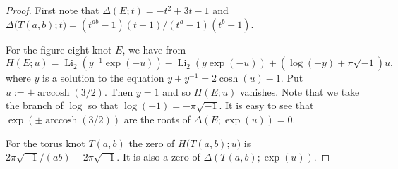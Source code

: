 \documentclass[a4paper]{amsart}
\theoremstyle{plain}
\theoremstyle{definition}
\theoremstyle{remark}
\newcommand{\Li}{\operatorname{Li}}
\newcommand{\arccosh}{\operatorname{arccosh}}
\numberwithin{equation}{section}
\begin{document}
\begin{proof}
First note that $\Delta(E;t)=-t^2+3t-1$ and
$\Delta\bigl(T(a,b);t\bigr)
=\left(t^{ab}-1\right)(t-1)/\left(t^a-1\right)\left(t^b-1\right)$.
\par
For the figure-eight knot $E$, we have from \cite{Murakami/Yokota:JREIA}
\begin{equation*}
  H(E;u)
  =
  \Li_2(y^{-1}\exp(-u))-\Li_2(y\exp(-u))+\left(\log(-y)+\pi\sqrt{-1}\right)u,
\end{equation*}
where $y$ is a solution to the equation $y+y^{-1}=2\cosh(u)-1$.
Put $u:=\pm\arccosh(3/2)$.
Then $y=1$ and so $H(E;u)$ vanishes.
Note that we take the branch of $\log$ so that $\log(-1)=-\pi\sqrt{-1}$.
It is easy to see that $\exp(\pm\arccosh(3/2))$ are the roots of $\Delta(E;\exp(u))=0$.
\par
For the torus knot $T(a,b)$ the zero of $H\bigl(T(a,b);u\bigr)$ is
$2\pi\sqrt{-1}/(ab)-2\pi\sqrt{-1}$.
It is also a zero of $\Delta(T(a,b);\exp(u))$.
\end{proof}


\end{document}
